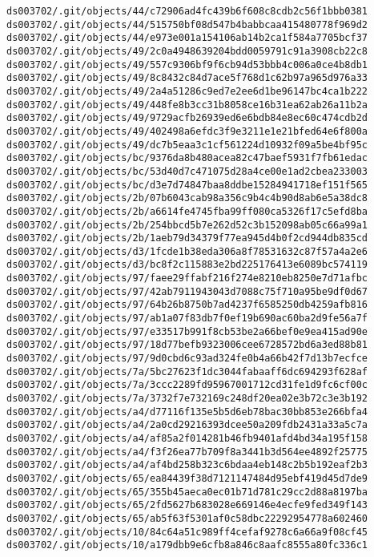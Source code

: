 \documentclass[11pt]{article}
\begin{document}
\begin{Verbatim}[commandchars=\\\{\}]
ds003702/.git/objects/44/c72906ad4fc439b6f608c8cdb2c56f1bbb0381
ds003702/.git/objects/44/515750bf08d547b4babbcaa415480778f969d2
ds003702/.git/objects/44/e973e001a154106ab14b2ca1f584a7705bcf37
ds003702/.git/objects/49/2c0a4948639204bdd0059791c91a3908cb22c8
ds003702/.git/objects/49/557c9306bf9f6cb94d53bbb4c006a0ce4b8db1
ds003702/.git/objects/49/8c8432c84d7ace5f768d1c62b97a965d976a33
ds003702/.git/objects/49/2a4a51286c9ed7e2ee6d1be96147bc4ca1b222
ds003702/.git/objects/49/448fe8b3cc31b8058ce16b31ea62ab26a11b2a
ds003702/.git/objects/49/9729acfb26939ed6e6bdb84e8ec60c474cdb2d
ds003702/.git/objects/49/402498a6efdc3f9e3211e1e21bfed64e6f800a
ds003702/.git/objects/49/dc7b5eaa3c1cf561224d10932f09a5be4bf95c
ds003702/.git/objects/bc/9376da8b480acea82c47baef5931f7fb61edac
ds003702/.git/objects/bc/53d40d7c471075d28a4ce00e1ad2cbea233003
ds003702/.git/objects/bc/d3e7d74847baa8ddbe15284941718ef151f565
ds003702/.git/objects/2b/07b6043cab98a356c9b4c4b90d8ab6e5a38dc8
ds003702/.git/objects/2b/a6614fe4745fba99ff080ca5326f17c5efd8ba
ds003702/.git/objects/2b/254bbcd5b7e262d52c3b152098ab05c66a99a1
ds003702/.git/objects/2b/1aeb79d34379f77ea945d4b0f2cd944db835cd
ds003702/.git/objects/d3/1fcde1b38eda306a8f78531632c87f57a4a2e6
ds003702/.git/objects/d3/bc8f2c115883e2bd225176413e6089bc574119
ds003702/.git/objects/97/faee29ffabf216f274e8210eb8250e7d71afbc
ds003702/.git/objects/97/42ab7911943043d7088c75f710a95be9df0d67
ds003702/.git/objects/97/64b26b8750b7ad4237f6585250db4259afb816
ds003702/.git/objects/97/ab1a07f83db7f0ef19b690ac60ba2d9fe56a7f
ds003702/.git/objects/97/e33517b991f8cb53be2a66bef0e9ea415ad90e
ds003702/.git/objects/97/18d77befb9323006cee6728572bd6a3ed88b81
ds003702/.git/objects/97/9d0cbd6c93ad324fe0b4a66b42f7d13b7ecfce
ds003702/.git/objects/7a/5bc27623f1dc3044fabaaff6dc694293f628af
ds003702/.git/objects/7a/3ccc2289fd95967001712cd31fe1d9fc6cf00c
ds003702/.git/objects/7a/3732f7e732169c248df20ea02e3b72c3e3b192
ds003702/.git/objects/a4/d77116f135e5b5d6eb78bac30bb853e266bfa4
ds003702/.git/objects/a4/2a0cd29216393dcee50a209fdb2431a33a5c7a
ds003702/.git/objects/a4/af85a2f014281b46fb9401afd4bd34a195f158
ds003702/.git/objects/a4/f3f26ea77b709f8a3441b3d564ee4892f25775
ds003702/.git/objects/a4/af4bd258b323c6bdaa4eb148c2b5b192eaf2b3
ds003702/.git/objects/65/ea84439f38d7121147484d95ebf419d45d7de9
ds003702/.git/objects/65/355b45aeca0ec01b71d781c29cc2d88a8197ba
ds003702/.git/objects/65/2fd5627b683028e669146e4ecfe9fed349f143
ds003702/.git/objects/65/ab5f63f5301af0c58dbc22292954778a602460
ds003702/.git/objects/10/84c64a51c989ff4cefaf9278c6a66a9f08cf45
ds003702/.git/objects/10/a179dbb9e6cfb8a846c8aafc8555a80fc336c1

\end{Verbatim}
\end{document}
